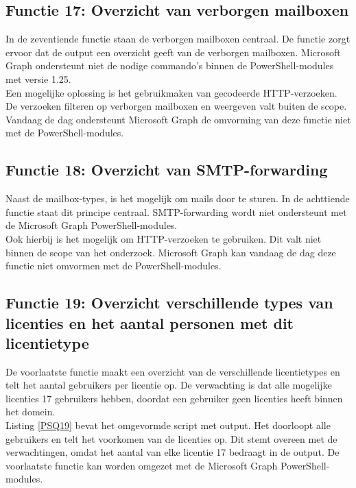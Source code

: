 \subsection{Functie 17: Overzicht van verborgen mailboxen}

In de zeventiende functie staan de verborgen mailboxen centraal. De functie zorgt ervoor dat de output een overzicht geeft van de verborgen mailboxen. Microsoft Graph ondersteunt niet de nodige commando's binnen de PowerShell-modules met versie 1.25. \\ 

Een mogelijke oplossing is het gebruikmaken van gecodeerde \ac{HTTP}-verzoeken. De verzoeken filteren op verborgen mailboxen en weergeven valt buiten de scope. Vandaag de dag ondersteunt Microsoft Graph de omvorming van deze functie niet met de PowerShell-modules.

\subsection{Functie 18: Overzicht van SMTP-forwarding}

Naast de mailbox-types, is het mogelijk om mails door te sturen. In de achttiende functie staat dit principe centraal. \Ac{SMTP}-forwarding wordt niet ondersteunt met de Microsoft Graph PowerShell-modules. \\

Ook hierbij is het mogelijk om \Ac{HTTP}-verzoeken te gebruiken. Dit valt niet binnen de scope van het onderzoek. Microsoft Graph kan vandaag de dag deze functie niet omvormen met de PowerShell-modules.

\subsection{Functie 19: Overzicht verschillende types van licenties en het aantal personen met dit licentietype}

De voorlaatste functie maakt een overzicht van de verschillende licentietypes en telt het aantal gebruikers per licentie op. De verwachting is dat alle mogelijke licenties 17 gebruikers hebben, doordat een gebruiker geen licenties heeft binnen het domein. \\

Listing \ref{PSQ19} bevat het omgevormde script met output. Het doorloopt alle gebruikers en telt het voorkomen van de licenties op. Dit stemt overeen met de verwachtingen, omdat het aantal van elke licentie 17 bedraagt in de output. De voorlaatste functie kan worden omgezet met de Microsoft Graph PowerShell-modules.

